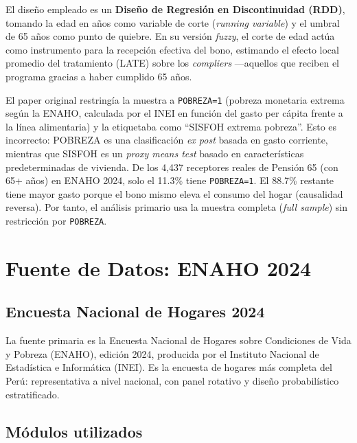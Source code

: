 \documentclass[12pt, a4paper]{article}
\begin{document}
El diseño empleado es un \textbf{Diseño de Regresión en Discontinuidad (RDD)},
tomando la edad en años como variable de corte (\textit{running variable})
y el umbral de 65 años como punto de quiebre. En su versión \textit{fuzzy},
el corte de edad actúa como instrumento para la recepción efectiva del bono,
estimando el efecto local promedio del tratamiento (LATE) sobre los
\textit{compliers} ---aquellos que reciben el programa gracias a haber
cumplido 65 años.

\begin{alertcaja}
El paper original restringía la muestra a \texttt{POBREZA=1} (pobreza
monetaria extrema según la ENAHO, calculada por el INEI en función del gasto
per cápita frente a la línea alimentaria) y la etiquetaba como ``SISFOH
extrema pobreza''. Esto es incorrecto: POBREZA es una clasificación
\textit{ex post} basada en gasto corriente, mientras que SISFOH es un
\textit{proxy means test} basado en características predeterminadas de
vivienda. De los 4{,}437 receptores reales de Pensión 65 (con 65+ años)
en ENAHO 2024, solo el 11.3\% tiene \texttt{POBREZA=1}. El 88.7\% restante
tiene mayor gasto porque el bono mismo eleva el consumo del hogar
(causalidad reversa). Por tanto, el análisis primario usa la muestra
completa (\textit{full sample}) sin restricción por \texttt{POBREZA}.
\end{alertcaja}

\section{Fuente de Datos: ENAHO 2024}

\subsection{Encuesta Nacional de Hogares 2024}

La fuente primaria es la Encuesta Nacional de Hogares sobre Condiciones de
Vida y Pobreza (ENAHO), edición 2024, producida por el Instituto Nacional
de Estadística e Informática (INEI). Es la encuesta de hogares más completa
del Perú: representativa a nivel nacional, con panel rotativo y diseño
probabilístico estratificado.

\subsection{Módulos utilizados}
\end{document}
